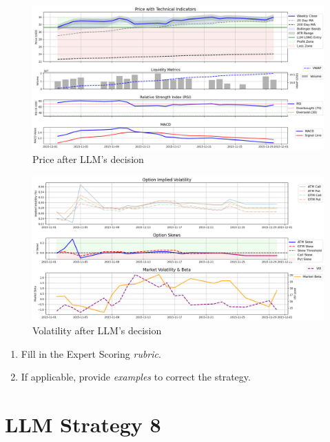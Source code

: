 \documentclass[8pt]{scrartcl}
\begin{document}
\begin{figure}[H]
    \centering
    \includegraphics[width=1\linewidth]{judge_reviews/AMZN_M_gpt-4o-mini/2015-11-02/llm_Price_with_Technical_Indicators.png}
    \caption{Price after LLM's decision}
\end{figure}

\begin{figure}[H]
    \centering
    \includegraphics[width=1\linewidth]{judge_reviews/AMZN_M_gpt-4o-mini/2015-11-02/llm_Market_Volatility_&_Beta.png}
    \caption{Volatility after LLM's decision}
\end{figure}

\begin{tcolorbox}[colback=blue!10, colframe=blue!60, title=\textbf{TASKS}, sharp corners=southwest]
\begin{enumerate}
    \item Fill in the Expert Scoring \textit{rubric}.
    \item If applicable, provide \textit{examples} to correct the strategy.
\end{enumerate}
\end{tcolorbox}
\newpage



\section*{LLM Strategy 8}
\label{app:s8}
\end{document}

